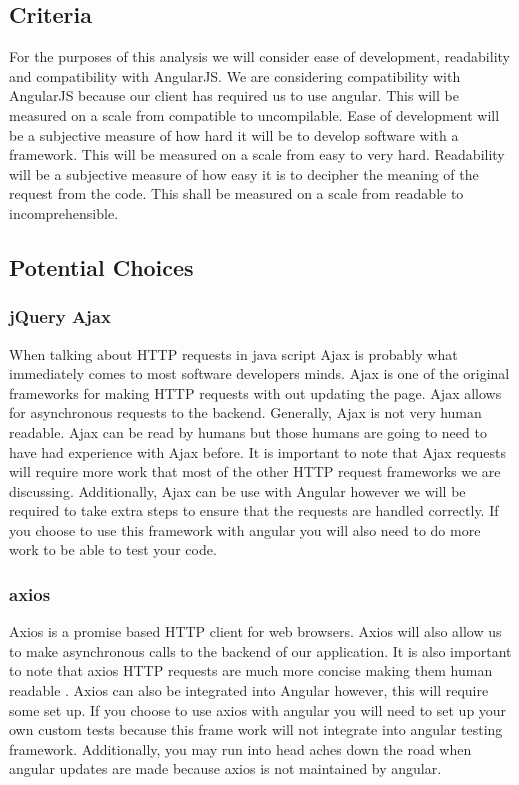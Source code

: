 \documentclass[onecolumn, draftclsnofoot,10pt, compsoc]{article}
\begin{document}
	\subsection{Criteria}
		For the purposes of this analysis we will consider ease of development, readability and compatibility with AngularJS. We are considering compatibility with AngularJS because our client has required us to use angular. This will be measured on a scale from compatible to uncompilable. Ease of development will be a subjective measure of how hard it will be to develop software with a framework. This will be measured on a scale from easy to very hard. Readability will be a subjective measure of how easy it is to decipher the meaning of the request from the code. This shall be measured on a scale from readable to incomprehensible.\\
	\subsection{Potential Choices}
		\subsubsection{jQuery Ajax}
			When talking about HTTP requests in java script Ajax is probably what immediately comes to most software developers minds. Ajax is one of the original frameworks for making HTTP requests with out updating the page. Ajax allows for asynchronous requests to the backend. Generally, Ajax is not very human readable. Ajax can be read by humans but those humans are going to need to have had experience with Ajax before. It is important to note that Ajax requests will require more work that most of the other HTTP request frameworks we are discussing. Additionally, Ajax can be use with Angular however we will be required to take extra steps to ensure that the requests are handled correctly. If you choose to use this framework with angular you will also need to do more work to be able to test your code.
		\subsubsection{axios}
			Axios is a promise based HTTP client for web browsers. Axios will also allow us to make asynchronous calls to the backend of our application. It is also important to note that axios HTTP requests are much more concise making them human readable \cite{IEEEexample:axios}. Axios can also be integrated into Angular however, this will require some set up. If you choose to use axios with angular you will need to set up your own custom tests because this frame work will not integrate into angular testing framework. Additionally, you may run into head aches down the road when angular updates are made because axios is not maintained by angular.
\end{document}
